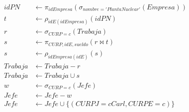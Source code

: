\documentclass{article}
\begin{document}
\begin{enumerate}
{{\begin{enumerate}
{\begin{enumerate}
\begin{align*}
                        	idPN & \leftarrow \pi_{idEmpresa}(\sigma_{nombre='PlantaNuclear'}(Empresa))\\
                        	t & \leftarrow \rho_{idE(idEmpresa)}(idPN)\\
                        	r & \leftarrow \sigma_{CURP = c}(Trabaja)\\
                        	s & \leftarrow \pi_{CURP,idE,sueldo}(r \bowtie t)\\
                        	s & \leftarrow \rho_{idEmpresa(idE)}(s)\\
                        	Trabaja & \leftarrow Trabaja - r\\
                        	Trabaja & \leftarrow Trabaja \cup s\\
                        	w & \leftarrow \sigma_{CURP = c} (Jefe)\\
                        	Jefe & \leftarrow Jefe - w\\
                        	Jefe & \leftarrow Jefe \cup \{(CURPJ = cCarl, CURPE = c)\} \\                           	
                        	\end{align*}
                        \end{enumerate}
                        
                    }
                \end{enumerate}
            }
        }
    \end{enumerate}
\end{document}
